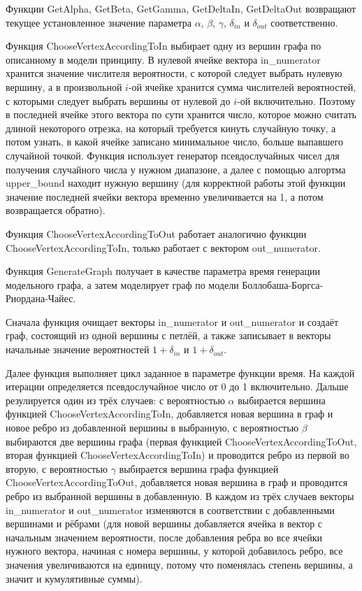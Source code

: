 \documentclass[14pt]{extreport}
\begin{document}
Функции GetAlpha, GetBeta, GetGamma, GetDeltaIn, GetDeltaOut возвращают текущее установленное значение параметра $\alpha$, $\beta$, $\gamma$, $\delta_{in}$ и $\delta_{out}$ соответственно.

Функция ChooseVertexAccordingToIn выбирает одну из вершин графа по описанному в модели принципу. В нулевой ячейке вектора in\_numerator хранится значение числителя вероятности, с которой следует выбрать нулевую вершину, а в произвольной $i$-ой ячейке хранится сумма числителей вероятностей, с которыми следует выбрать вершины от нулевой до $i$-ой включительно. Поэтому в последней ячейке этого вектора по сути хранится число, которое можно считать длиной некоторого отрезка, на который требуется кинуть случайную точку, а потом узнать, в какой ячейке записано минимальное число, больше выпавшего случайной точкой. Функция использует генератор псевдослучайных чисел для получения случайного числа у нужном диапазоне, а далее с помощью алгортма upper\_bound находит нужную вершину (для корректной работы этой функции значение последней ячейки вектора временно увеличивается на 1, а потом возвращается обратно).

Функция ChooseVertexAccordingToOut работает аналогично функции ChooseVertexAccordingToIn, только работает с вектором out\_numerator.

Функция GenerateGraph получает в качестве параметра время генерации модельного графа, а затем моделирует граф по модели Боллобаша-Боргса-Риордана-Чайес.

Сначала функция очищает векторы in\_numerator и out\_numerator и создаёт граф, состоящий из одной вершины с петлёй, а также записывает в векторы начальные значение вероятностей $1 + \delta_{in}$ и $1 + \delta_{out}$.

Далее функция выполняет цикл заданное в параметре функции время. На каждой итерации определяется псевдослучайное число от 0 до 1 включительно. Дальше резулируется один из трёх случаев: с вероятностью $\alpha$ выбирается вершина функцией ChooseVertexAccordingToIn, добавляется новая вершина в граф и новое ребро из добавленной вершины в выбранную, с вероятностью $\beta$ выбираются две вершины графа (первая функцией ChooseVertexAccordingToOut, вторая функцией ChooseVertexAccordingToIn) и проводится ребро из первой во вторую, с вероятностью $\gamma$ выбирается вершина графа функцией ChooseVertexAccordingToOut, добавляется новая вершина в граф и проводится ребро из выбранной вершины в добавленную. В каждом из трёх случаев векторы in\_numerator и out\_numerator изменяются в соответствии с добавленными вершинами и рёбрами (для новой вершины добавляется ячейка в вектор с начальным значением вероятности, после добавления ребра во все ячейки нужного вектора, начиная с номера вершины, у которой добавилось ребро, все значения увеличиваются на единицу, потому что поменялась степень вершины, а значит и кумулятивные суммы).
\end{document}
